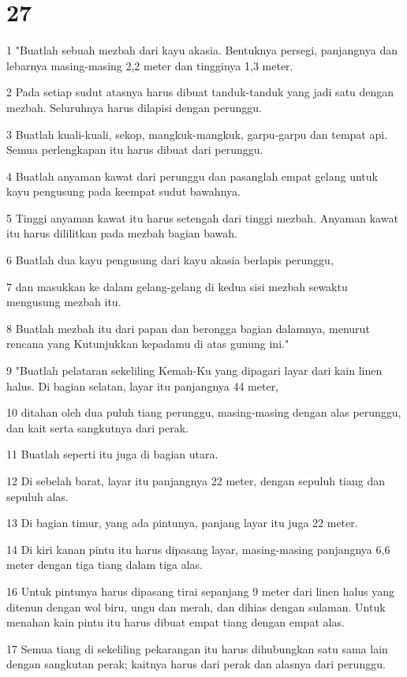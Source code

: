 \chapter{27}

\par 1 "Buatlah sebuah mezbah dari kayu akasia. Bentuknya persegi, panjangnya dan lebarnya masing-masing 2,2 meter dan tingginya 1,3 meter.
\par 2 Pada setiap sudut atasnya harus dibuat tanduk-tanduk yang jadi satu dengan mezbah. Seluruhnya harus dilapisi dengan perunggu.
\par 3 Buatlah kuali-kuali, sekop, mangkuk-mangkuk, garpu-garpu dan tempat api. Semua perlengkapan itu harus dibuat dari perunggu.
\par 4 Buatlah anyaman kawat dari perunggu dan pasanglah empat gelang untuk kayu pengusung pada keempat sudut bawahnya.
\par 5 Tinggi anyaman kawat itu harus setengah dari tinggi mezbah. Anyaman kawat itu harus dililitkan pada mezbah bagian bawah.
\par 6 Buatlah dua kayu pengusung dari kayu akasia berlapis perunggu,
\par 7 dan masukkan ke dalam gelang-gelang di kedua sisi mezbah sewaktu mengusung mezbah itu.
\par 8 Buatlah mezbah itu dari papan dan berongga bagian dalamnya, menurut rencana yang Kutunjukkan kepadamu di atas gunung ini."
\par 9 "Buatlah pelataran sekeliling Kemah-Ku yang dipagari layar dari kain linen halus. Di bagian selatan, layar itu panjangnya 44 meter,
\par 10 ditahan oleh dua puluh tiang perunggu, masing-masing dengan alas perunggu, dan kait serta sangkutnya dari perak.
\par 11 Buatlah seperti itu juga di bagian utara.
\par 12 Di sebelah barat, layar itu panjangnya 22 meter, dengan sepuluh tiang dan sepuluh alas.
\par 13 Di bagian timur, yang ada pintunya, panjang layar itu juga 22 meter.
\par 14 Di kiri kanan pintu itu harus dipasang layar, masing-masing panjangnya 6,6 meter dengan tiga tiang dalam tiga alas.
\par 16 Untuk pintunya harus dipasang tirai sepanjang 9 meter dari linen halus yang ditenun dengan wol biru, ungu dan merah, dan dihias dengan sulaman. Untuk menahan kain pintu itu harus dibuat empat tiang dengan empat alas.
\par 17 Semua tiang di sekeliling pekarangan itu harus dihubungkan satu sama lain dengan sangkutan perak; kaitnya harus dari perak dan alasnya dari perunggu.
